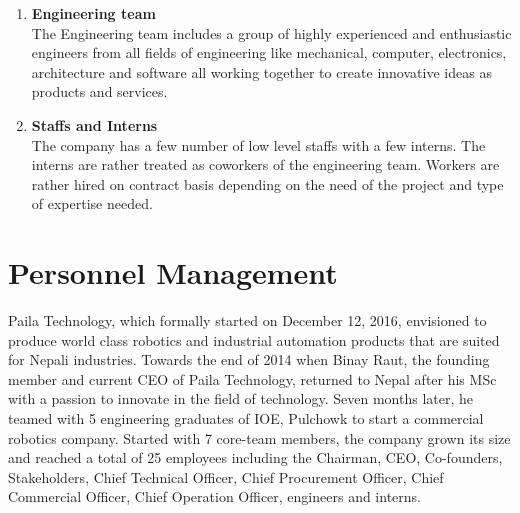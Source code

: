 \documentclass[12pt,a4paper]{scrreprt}
\begin{document}
\begin{enumerate}
            \item \textbf{Engineering team} \\
            The Engineering team includes a group of highly experienced and enthusiastic engineers from all fields of engineering like mechanical, computer, electronics, architecture and software all working together to create innovative ideas as products and services.

            \item \textbf{Staffs and Interns} \\
            The company has a few number of low level staffs with a few interns. The interns are rather treated as coworkers of the engineering team. Workers are rather hired on contract basis depending on the need of the project and type of expertise needed.


        \end{enumerate}


\chapter{Personnel Management}
Paila Technology, which formally started on December 12, 2016, envisioned to produce world class robotics and industrial automation products that are suited for Nepali industries. Towards the end of 2014 when Binay Raut, the founding member and current CEO of Paila Technology, returned to Nepal after his MSc with a passion to innovate in the field of technology. Seven months later, he teamed with 5 engineering graduates of IOE, Pulchowk to start a commercial robotics company. Started with 7 core-team members, the company grown its size and reached a total of 25 employees including the Chairman, CEO, Co-founders, Stakeholders, Chief Technical Officer, Chief Procurement Officer, Chief Commercial Officer, Chief Operation Officer, engineers and interns.
\end{document}

